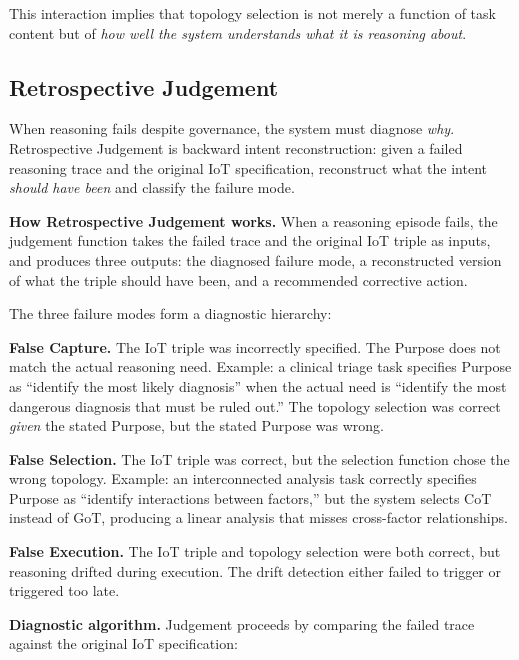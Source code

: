 \documentclass[11pt,a4paper]{article}
\begin{document}
This interaction implies that topology selection is not merely a
function of task content but of \emph{how well the system understands
what it is reasoning about}.

\subsection{Retrospective Judgement}\label{retrospective-judgement}

When reasoning fails despite governance, the system must diagnose
\emph{why}. Retrospective Judgement is backward intent reconstruction:
given a failed reasoning trace and the original IoT specification,
reconstruct what the intent \emph{should have been} and classify the
failure mode.

\textbf{How Retrospective Judgement works.} When a reasoning episode
fails, the judgement function takes the failed trace and the original
IoT triple as inputs, and produces three outputs: the diagnosed failure
mode, a reconstructed version of what the triple should have been, and a
recommended corrective action.

The three failure modes form a diagnostic hierarchy:

\textbf{False Capture.} The IoT triple was incorrectly specified. The
Purpose does not match the actual reasoning need. Example: a clinical
triage task specifies Purpose as ``identify the most likely diagnosis''
when the actual need is ``identify the most dangerous diagnosis that
must be ruled out.'' The topology selection was correct \emph{given} the
stated Purpose, but the stated Purpose was wrong.

\textbf{False Selection.} The IoT triple was correct, but the selection
function chose the wrong topology. Example: an interconnected analysis
task correctly specifies Purpose as ``identify interactions between
factors,'' but the system selects CoT instead of GoT, producing a linear
analysis that misses cross-factor relationships.

\textbf{False Execution.} The IoT triple and topology selection were
both correct, but reasoning drifted during execution. The drift
detection either failed to trigger or triggered too late.

\textbf{Diagnostic algorithm.} Judgement proceeds by comparing the
failed trace against the original IoT specification:
\end{document}
